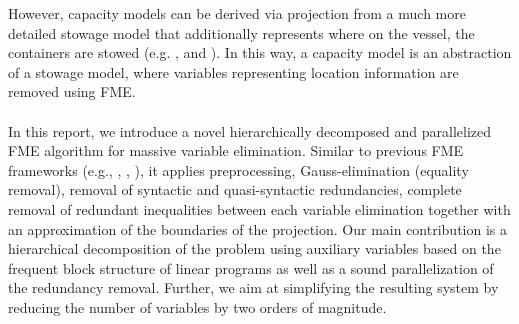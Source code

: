 However, capacity models can be derived via projection from a much more detailed stowage model that {additionally} represents where on the vessel, the containers are stowed (e.g. {\cite{pacino11}, \cite{pacino12} and \cite{AlbertosThesis}}). In this way, a capacity model is an abstraction of a stowage model, where variables representing location information are removed using FME.  
%
\\\\
In this report, we introduce a novel hierarchically decomposed and parallelized FME algorithm for massive variable elimination. Similar to previous FME frameworks (e.g., \cite{simon05}, \cite{lukatskii08}, \cite{shapot12}), it applies 
{preprocessing}, Gauss\--eli\-mi\-na\-tion (equality removal), removal of syntactic and quasi-syntactic redundancies, complete removal of redundant inequalities between each variable elimination together with an approximation of the boundaries of the projection. Our main contribution is a hierarchical decomposition of the problem using auxiliary variables based on the frequent block structure of linear programs as well as a sound parallelization of the redundancy removal. Further, we aim at simplifying the resulting system by reducing the number of variables by two orders of magnitude.

